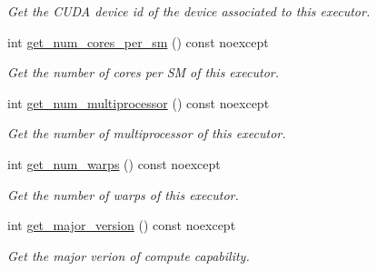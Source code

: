 \begin{DoxyCompactItemize}
\begin{DoxyCompactList}\small\item\em Get the C\+U\+DA device id of the device associated to this executor. \end{DoxyCompactList}\item 
\mbox{\label{classgko_1_1CudaExecutor_a213c222fd8ef58952328fbe3a9b5ff39}} 
int \hyperlink{classgko_1_1CudaExecutor_a213c222fd8ef58952328fbe3a9b5ff39}{get\+\_\+num\+\_\+cores\+\_\+per\+\_\+sm} () const noexcept
\begin{DoxyCompactList}\small\item\em Get the number of cores per SM of this executor. \end{DoxyCompactList}\item 
\mbox{\label{classgko_1_1CudaExecutor_a449c2bf9c51b58a04fdb8b4a73377820}} 
int \hyperlink{classgko_1_1CudaExecutor_a449c2bf9c51b58a04fdb8b4a73377820}{get\+\_\+num\+\_\+multiprocessor} () const noexcept
\begin{DoxyCompactList}\small\item\em Get the number of multiprocessor of this executor. \end{DoxyCompactList}\item 
\mbox{\label{classgko_1_1CudaExecutor_aa9d77db0b87322a8bef12380029b5310}} 
int \hyperlink{classgko_1_1CudaExecutor_aa9d77db0b87322a8bef12380029b5310}{get\+\_\+num\+\_\+warps} () const noexcept
\begin{DoxyCompactList}\small\item\em Get the number of warps of this executor. \end{DoxyCompactList}\item 
\mbox{\label{classgko_1_1CudaExecutor_a3868f53f82b6398acb1ba1f9647a6e46}} 
int \hyperlink{classgko_1_1CudaExecutor_a3868f53f82b6398acb1ba1f9647a6e46}{get\+\_\+major\+\_\+version} () const noexcept
\begin{DoxyCompactList}\small\item\em Get the major verion of compute capability. \end{DoxyCompactList}\item 
\mbox{\label{classgko_1_1CudaExecutor_aa7d7a5cd7aeb38b8ab8fe3e4d1538481}} 

\end{DoxyCompactItemize}
